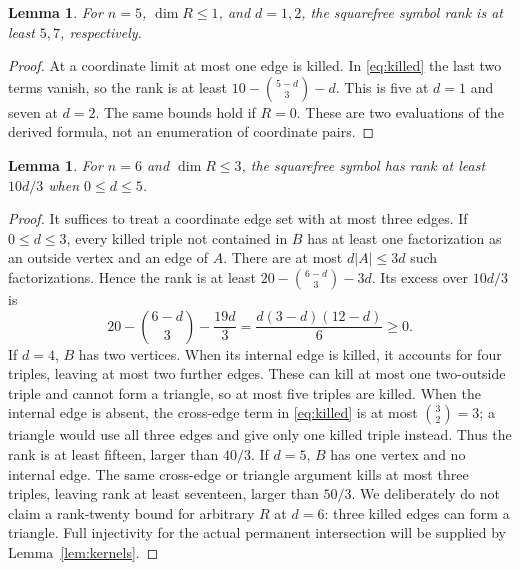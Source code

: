 \documentclass[11pt]{amsart}
\newtheorem{lemma}[theorem]{Lemma}
\theoremstyle{remark}\newtheorem{remark}[theorem]{Remark}
\numberwithin{equation}{section}
\begin{document}
\begin{lemma}\label{lem:five-sf}
For $n=5$, $\dim R\le1$, and $d=1,2$, the squarefree symbol rank is
at least $5,7$, respectively.
\end{lemma}
\begin{proof}
At a coordinate limit at most one edge is killed. In \eqref{eq:killed}
the last two terms vanish, so the rank is at least
$10-\binom{5-d}{3}-d$. This is five at $d=1$ and seven at $d=2$.
The same bounds hold if $R=0$. These are two evaluations of the derived
formula, not an enumeration of coordinate pairs.
\end{proof}

\begin{lemma}\label{lem:six-sf}
For $n=6$ and $\dim R\le3$, the squarefree symbol has rank at least
$10d/3$ when $0\le d\le5$.
\end{lemma}
\begin{proof}
It suffices to treat a coordinate edge set with at most three edges.
If $0\le d\le3$, every killed triple not contained in $B$ has at least
one factorization as an outside vertex and an edge of $A$. There are
at most $d|A|\le3d$ such factorizations. Hence the rank is at least
$20-\binom{6-d}{3}-3d$. Its excess over $10d/3$ is
\[
 20-\binom{6-d}{3}-\frac{19d}{3}
 =\frac{d(3-d)(12-d)}6\ge0.
\]
If $d=4$, $B$ has two vertices. When its internal edge is killed, it
accounts for four triples, leaving at most two further edges. These can
kill at most one two-outside triple and cannot form a triangle, so at most
five triples are killed. When the internal edge is absent, the cross-edge
term in \eqref{eq:killed} is at most $\binom32=3$; a triangle would use
all three edges and give only one killed triple instead. Thus the rank
is at least fifteen, larger than $40/3$.
If $d=5$, $B$ has one vertex and no internal edge. The same cross-edge or
triangle argument kills at most three triples, leaving rank at least
seventeen, larger than $50/3$.
We deliberately do not claim a rank-twenty bound for arbitrary $R$ at
$d=6$: three killed edges can form a triangle. Full injectivity for the
actual permanent intersection will be supplied by Lemma~\ref{lem:kernels}.
\end{proof}
\end{document}

